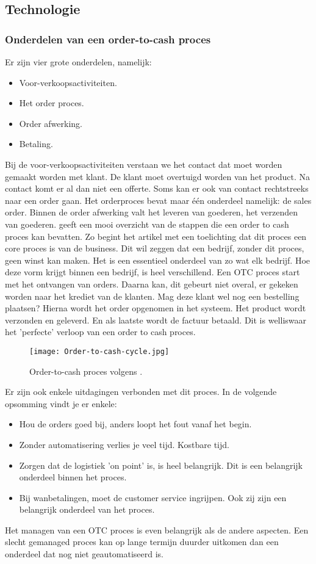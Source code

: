 \subsection{Technologie}
\subsubsection{Onderdelen van een order-to-cash proces}
Er zijn vier grote onderdelen, namelijk:
\begin{itemize}
	\item Voor-verkoopsactiviteiten.
	\item Het order proces.
	\item Order afwerking.
	\item Betaling.
\end{itemize}
Bij de voor-verkoopsactiviteiten verstaan we het contact dat moet worden gemaakt worden met klant. De klant moet overtuigd worden van het product. Na contact komt er al dan niet een offerte. Soms kan er ook van contact rechtstreeks naar een order gaan. 
Het orderproces bevat maar één onderdeel namelijk: de sales order. 
Binnen de order afwerking valt het leveren van goederen, het verzenden van goederen.
\textcite{Kumaran2015} geeft een mooi overzicht van de stappen die een order to cash proces kan bevatten. Zo begint het artikel met een toelichting dat dit proces een core proces is van de business. Dit wil zeggen dat een bedrijf, zonder dit proces, geen winst kan maken. Het is een essentieel onderdeel van zo wat elk bedrijf. Hoe deze vorm krijgt binnen een bedrijf, is heel verschillend. Een OTC proces start met het ontvangen van orders. Daarna kan, dit gebeurt niet overal, er gekeken worden naar het krediet van de klanten. Mag deze klant wel nog een bestelling plaatsen? Hierna wordt het order opgenomen in het systeem. Het product wordt verzonden en geleverd. En als laatste wordt de factuur betaald. Dit is welliswaar het 'perfecte' verloop van een order to cash proces. 
\begin{figure}[h]
	\texttt{[image: Order-to-cash-cycle.jpg]}
	\caption{Order-to-cash proces volgens \textcite{Kumaran2015}.}
	\centering
\end{figure}
Er zijn ook enkele uitdagingen verbonden met dit proces. In de volgende opsomming vindt je er enkele:
\begin{itemize}
	\item Hou de orders goed bij, anders loopt het fout vanaf het begin. 
	\item Zonder automatisering verlies je veel tijd. Kostbare tijd.
	\item Zorgen dat de logistiek 'on point' is, is heel belangrijk. Dit is een belangrijk onderdeel binnen het proces.
	\item Bij wanbetalingen, moet de customer service ingrijpen. Ook zij zijn een belangrijk onderdeel van het proces.
\end{itemize}
Het managen van een OTC proces is even belangrijk als de andere aspecten. Een slecht gemanaged proces kan op lange termijn duurder uitkomen dan een onderdeel dat nog niet geautomatiseerd is. 

